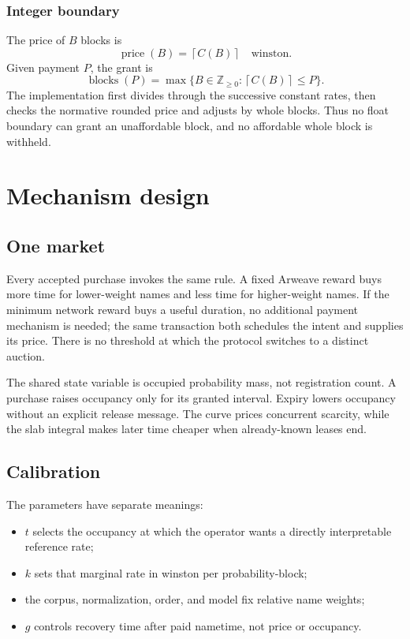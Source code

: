 \documentclass[10pt,twocolumn]{article}
\newcommand{\ceil}[1]{\left\lceil #1\right\rceil}
\begin{document}
\subsubsection{Integer boundary}

The price of $B$ blocks is
\[
  \operatorname{price}(B)=\ceil{C(B)}\quad\text{winston}.
\]
Given payment $P$, the grant is
\[
  \operatorname{blocks}(P)=
  \max\{B\in\mathbb Z_{\geq0}:\ceil{C(B)}\leq P\}.
\]
The implementation first divides through the successive constant rates, then
checks the normative rounded price and adjusts by whole blocks. Thus no float
boundary can grant an unaffordable block, and no affordable whole block is
withheld.

\section{Mechanism design}

\subsection{One market}

Every accepted purchase invokes the same rule. A fixed Arweave reward buys
more time for lower-weight names and less time for higher-weight names. If the
minimum network reward buys a useful duration, no additional payment mechanism
is needed; the same transaction both schedules the intent and supplies its
price. There is no threshold at which the protocol switches to a distinct
auction.

The shared state variable is occupied probability mass, not registration
count. A purchase raises occupancy only for its granted interval. Expiry lowers
occupancy without an explicit release message. The curve prices concurrent
scarcity, while the slab integral makes later time cheaper when already-known
leases end.

\subsection{Calibration}

The parameters have separate meanings:
\begin{itemize}
  \item $t$ selects the occupancy at which the operator wants a directly
        interpretable reference rate;
  \item $k$ sets that marginal rate in winston per probability-block;
  \item the corpus, normalization, order, and model fix relative name weights;
  \item $g$ controls recovery time after paid nametime, not price or occupancy.
\end{itemize}
\end{document}
